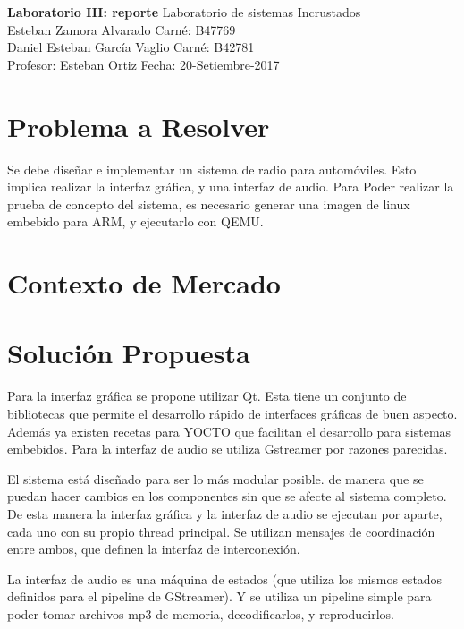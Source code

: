 

\noindent
\large\textbf{Laboratorio III: reporte} \hfill Laboratorio de sistemas Incrustados \\
\normalsize Esteban Zamora Alvarado \hfill Carné: B47769 \\
Daniel Esteban García Vaglio \hfill Carné: B42781 \\
Profesor: Esteban Ortiz  \hfill Fecha: 20-Setiembre-2017 \\

\section{Problema a Resolver}
\label{sec:Problem}
Se debe diseñar e implementar un sistema de radio para automóviles. Esto implica realizar la
interfaz gráfica, y una interfaz de audio. Para Poder realizar la prueba de concepto del sistema, es
necesario generar una imagen de linux embebido para ARM, y ejecutarlo con QEMU. 

\section{Contexto de Mercado}
\label{sec:Context}

\section{Solución Propuesta}
\label{sec:solution}
Para la interfaz gráfica se propone utilizar Qt. Esta tiene un conjunto de bibliotecas que permite
el desarrollo rápido de interfaces gráficas de buen aspecto. Además ya existen recetas para YOCTO
que facilitan el desarrollo para sistemas embebidos. Para la interfaz de audio se utiliza Gstreamer
por razones parecidas.

El sistema está diseñado para ser lo más modular posible. de manera que se puedan hacer cambios en
los componentes sin que se afecte al sistema completo. De esta manera la interfaz gráfica y la
interfaz de audio se ejecutan por aparte, cada uno con su propio thread principal. Se utilizan
mensajes de coordinación entre ambos, que definen la interfaz de interconexión.

La interfaz de audio es una máquina de estados (que utiliza los mismos estados definidos para el
pipeline de GStreamer). Y se utiliza un pipeline simple para poder tomar archivos mp3 de memoria,
decodificarlos, y reproducirlos.


